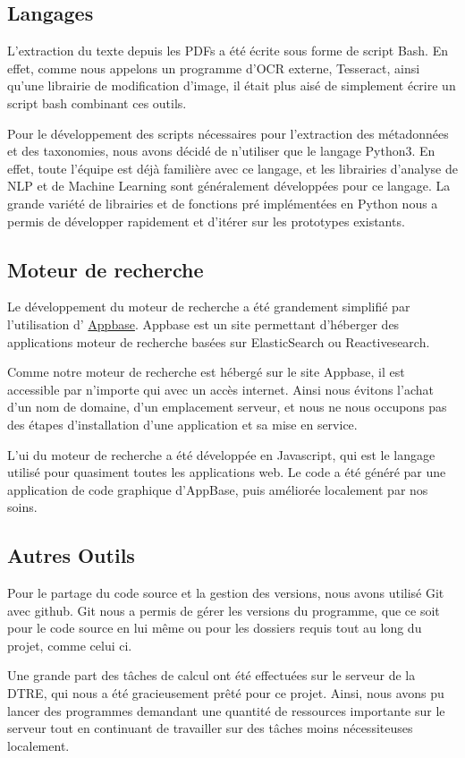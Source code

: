
\subsection{Langages}
L'extraction du texte depuis les PDFs a été écrite sous forme de script Bash.
En effet, comme nous appelons un programme d'\gls{OCR} externe, Tesseract, ainsi qu'une librairie de modification d'image, il était plus aisé de simplement écrire un script bash combinant ces outils.

Pour le développement des scripts nécessaires pour l'extraction des métadonnées et des taxonomies, nous avons décidé de n'utiliser que le langage Python3.
En effet, toute l'équipe est déjà familière avec ce langage, et les librairies d'analyse de \gls{NLP} et de Machine Learning sont généralement développées pour ce langage.
La grande variété de librairies et de fonctions pré implémentées en Python nous a permis de développer rapidement et d'itérer sur les prototypes existants. 

\subsection{Moteur de recherche}
Le développement du moteur de recherche a été grandement simplifié par l'utilisation d' \href{https://appbase.io}{Appbase}.
Appbase est un site permettant d'héberger des applications moteur de recherche basées sur ElasticSearch ou Reactivesearch.

Comme notre moteur de recherche est hébergé sur le site Appbase, il est accessible par n'importe qui avec un accès internet.
Ainsi nous évitons l'achat d'un nom de domaine, d'un emplacement serveur, et nous ne nous occupons pas des étapes d'installation d'une application et sa mise en service. 

L'\gls{ui} du moteur de recherche a été développée en Javascript, qui est le langage utilisé pour quasiment toutes les applications web. 
Le code a été généré par une application de code graphique d'AppBase, puis améliorée localement par nos soins.

\subsection{Autres Outils}
Pour le partage du code source et la gestion des versions, nous avons utilisé Git avec github.
Git nous a permis de gérer les versions du programme, que ce soit pour le code source en lui même ou pour les dossiers requis tout au long du projet, comme celui ci. 

Une grande part des tâches de calcul ont été effectuées sur le serveur de la DTRE, qui nous a été gracieusement prêté pour ce projet.
Ainsi, nous avons pu lancer des programmes demandant une quantité de ressources importante sur le serveur tout en continuant de travailler sur des tâches moins nécessiteuses localement.





